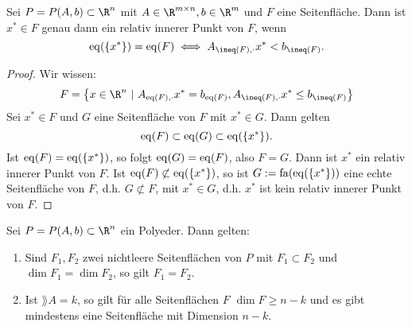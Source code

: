 \begin{satz}
  Sei $P = P(A,b) \subset  \R^n$ mit $A \in \R^{m \times n},b\in \R^m$ und $F$ eine Seitenfläche.
  Dann ist $x^* \in F$ genau dann ein relativ innerer Punkt von $F$, wenn 
  \begin{equation*}
    \eq(\left\{x^* \right\}) = \eq(F) \iff A_{\ineq(F),\cdot}x^* < b_{\ineq(F)}.
  \end{equation*} 
\end{satz}
\begin{proof}
	Wir wissen: 
	\begin{equation*}
		F = \left\{ x \in \R^n \ |\ A_{\eq(F),\cdot}x^* = b_{\eq(F)},A_{\ineq(F),\cdot}x^* \leq b_{\ineq(F)} \right\}
	\end{equation*}
	Sei $x^* \in F $ und $G$ eine Seitenfläche von $F$ mit $x^* \in G$. Dann gelten
	\begin{equation*}
		\operatorname{eq}(F) \subset \operatorname{eq}(G) \subset \operatorname{eq}(\left\{x^* \right\}).
	\end{equation*}
	Ist $\operatorname{eq}(F) = \operatorname{eq}( \left\{x^* \right\})$, so folgt $\operatorname{eq}(G) = \operatorname{eq}(F)$, also $F = G$.
	Dann ist $x^*$ ein relativ innerer Punkt von $F$.
	Ist $\operatorname{eq}(F) \not\subset \operatorname{eq}(\left\{x^* \right\})$, so ist $G:=\operatorname{fa}(\operatorname{eq}(\left\{x^* \right\}))$ eine echte Seitenfläche von $F$, d.h. $G \not\subset F$, mit $x^* \in G$, d.h. $x^*$ ist kein relativ innerer Punkt von $F$.
\end{proof}
\begin{korollar}
	Sei $P=P(A,b)\subset \R^n$ ein Polyeder. Dann gelten:
	\begin{enumerate}[label= (\alph*)]
		\item Sind $F_{1},F_{2}$ zwei nichtleere Seitenflächen von $P$ mit $F_{1}\subset F_{2}$ und $\dim F_{1} = \dim F_{2}$, so gilt $F_{1} = F_{2}$.
		\item Ist $\rang A = k$, so gilt für alle Seitenflächen $F$ $\dim F \geq n-k$ und es gibt mindestens eine Seitenfläche mit Dimension $n-k$.
	\end{enumerate}
\end{korollar}

